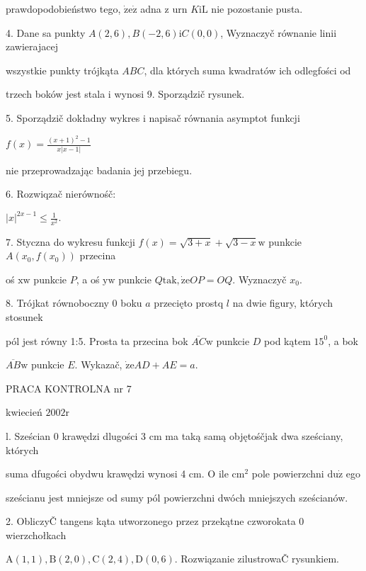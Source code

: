 \documentclass[a4paper,12pt]{article}
\begin{document}
prawdopodobieństwo tego, $\dot{\mathrm{z}}\mathrm{e}\dot{\mathrm{z}}$ adna $\mathrm{z}$ urn $K\mathrm{i}\mathrm{L}$ nie pozostanie pusta.

4. Dane sa punkty $A(2,6), B(-2,6)\mathrm{i}C(0,0)$, Wyznaczyč równanie linii zawierajacej

wszystkie punkty trójkąta $ABC$, dla których suma kwadratów ich odlegfości od

trzech boków jest stala $\mathrm{i}$ wynosi 9. Sporządzič rysunek.

5. Sporządzič dokładny wykres $\mathrm{i}$ napisač równania asymptot funkcji

$f(x)=\displaystyle \frac{(x+1)^{2}-1}{x|x-1|}$

nie przeprowadzając badania jej przebiegu.

6. Rozwiqzač nierównośč:

$|x|^{2x-1}\displaystyle \leq\frac{1}{x^{2}}.$

7. Styczna do wykresu funkcji $f(x)=\sqrt{3+x}+\sqrt{3-x}\mathrm{w}$ punkcie $A(x_{0},f(x_{0}))$ przecina

oś $\mathrm{x}\mathrm{w}$ punkcie $P$, a oś $\mathrm{y}\mathrm{w}$ punkcie $Q\mathrm{t}\mathrm{a}\mathrm{k}, \dot{\mathrm{z}}\mathrm{e}OP=OQ$. Wyznaczyč $x_{0}.$

8. Trójkat równoboczny $0$ boku $a$ przecięto prostq $l$ na dwie figury, których stosunek

pól jest równy 1:5. Prosta ta przecina bok $\overline{AC}\mathrm{w}$ punkcie $D$ pod kątem $15^{0}$, a bok

$\overline{AB}\mathrm{w}$ punkcie $E$. Wykazač, $\dot{\mathrm{z}}\mathrm{e}AD+AE=a.$





PRACA KONTROLNA nr 7

kwiecień $2002\mathrm{r}$

l. Sześcian $0$ krawędzi dlugości 3 cm ma taką samą objętośčjak dwa sześciany, których

suma dfugości obydwu krawędzi wynosi 4 cm. $\mathrm{O}$ ile $\mathrm{c}\mathrm{m}^{2}$ pole powierzchni $\mathrm{d}\mathrm{u}\dot{\mathrm{z}}$ ego

sześcianu jest mniejsze od sumy pól powierzchni dwóch mniejszych sześcianów.

2. ObliczyČ tangens kąta utworzonego przez przekątne czworokata $0$ wierzchołkach

$\mathrm{A}(1,1), \mathrm{B}(2,0), \mathrm{C}(2,4), \mathrm{D}(0,6)$. Rozwiązanie zilustrowaČ rysunkiem.
\end{document}

